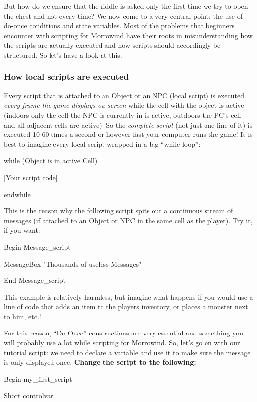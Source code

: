 \documentclass[
]{article}
\begin{document}
But how do we ensure that the riddle is asked only the first time we try
to open the chest and not every time? We now come to a very central
point: the use of do-once conditions and state variables. Most of the
problems that beginners encounter with scripting for Morrowind have
their roots in misunderstanding how the scripts are actually executed
and how scripts should accordingly be structured. So let's have a look
at this.

\hypertarget{how-local-scripts-are-executed}{%
\subsubsection{How local scripts are
executed}\label{how-local-scripts-are-executed}}

Every script that is attached to an Object or an NPC (local script) is
executed \emph{every frame the game displays on screen} while the cell
with the object is active (indoors only the cell the NPC is currently in
is active, outdoors the PC's cell and all adjacent cells are active). So
the \emph{complete script} (not just one line of it) is executed 10-60
times a second or however fast your computer runs the game! It is best
to imagine every local script wrapped in a big ``while-loop'':

while (Object is in active Cell)

{[}Your script code{]}

endwhile

This is the reason why the following script spits out a continuous
stream of messages (if attached to an Object or NPC in the same cell as
the player). Try it, if you want:

Begin Message\_script

MessageBox "Thousands of useless Messages"

End Message\_script

This example is relatively harmless, but imagine what happens if you
would use a line of code that adds an item to the players inventory, or
places a monster next to him, etc.!

For this reason, ``Do Once'' constructions are very essential and
something you will probably use a lot while scripting for Morrowind. So,
let's go on with our tutorial script: we need to declare a variable and
use it to make sure the message is only displayed once. \textbf{Change
the script to the following:}

Begin my\_first\_script

Short controlvar
\end{document}
